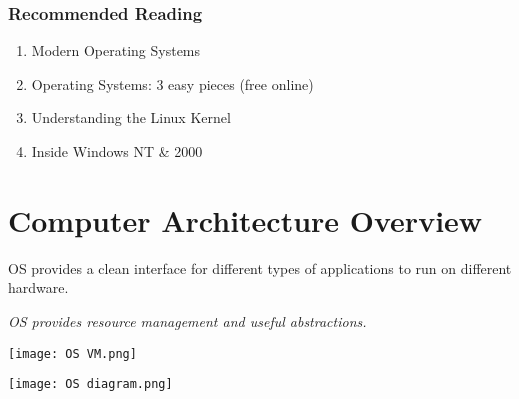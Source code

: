 \documentclass{report}
\begin{document}
            \subsubsection*{Recommended Reading}
                \begin{enumerate}
                    \item Modern Operating Systems
                    \item Operating Systems: 3 easy pieces (free online)
                    \item Understanding the Linux Kernel
                    \item Inside Windows NT \& 2000
                \end{enumerate}
    
    \section*{Computer Architecture Overview}
        OS provides a clean interface for different types of applications to run on different hardware.
        \\ \centerline{\textit{OS provides resource management and useful abstractions.}}
        \begin{center}
            \texttt{[image: OS VM.png]} \\
        \end{center}
        \begin{center}
            \texttt{[image: OS diagram.png]}
        \end{center}
\end{document}
